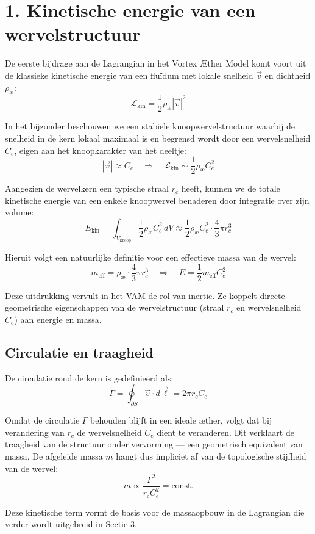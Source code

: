 \section*{1. Kinetische energie van een wervelstructuur}

De eerste bijdrage aan de Lagrangian in het Vortex Æther Model komt voort uit de klassieke kinetische energie van een fluïdum met lokale snelheid $\vec{v}$ en dichtheid $\rho_\text{\ae}$:
\[
    \mathcal{L}_\text{kin} = \frac{1}{2} \rho_\text{\ae} |\vec{v}|^2
\]

In het bijzonder beschouwen we een stabiele knoopwervelstructuur waarbij de snelheid in de kern lokaal maximaal is en begrensd wordt door een wervelsnelheid $C_e$, eigen aan het knoopkarakter van het deeltje:
\[
    |\vec{v}| \approx C_e \quad \Rightarrow \quad \mathcal{L}_\text{kin} \sim \frac{1}{2} \rho_\text{\ae} C_e^2
\]

Aangezien de wervelkern een typische straal $r_c$ heeft, kunnen we de totale kinetische energie van een enkele knoopwervel benaderen door integratie over zijn volume:
\[
    E_\text{kin} = \int_{V_\text{knoop}} \frac{1}{2} \rho_\text{\ae} C_e^2 \, dV \approx \frac{1}{2} \rho_\text{\ae} C_e^2 \cdot \frac{4}{3}\pi r_c^3
\]

Hieruit volgt een natuurlijke definitie voor een effectieve massa van de wervel:
\[
    m_\text{eff} = \rho_\text{\ae} \cdot \frac{4}{3}\pi r_c^3
    \quad \Rightarrow \quad E = \frac{1}{2} m_\text{eff} C_e^2
\]

Deze uitdrukking vervult in het VAM de rol van inertie. Ze koppelt directe geometrische eigenschappen van de wervelstructuur (straal $r_c$ en wervelsnelheid $C_e$) aan energie en massa.

\subsection*{Circulatie en traagheid}
De circulatie rond de kern is gedefinieerd als:
\[
    \Gamma = \oint_{\partial S} \vec{v} \cdot d\vec{\ell} = 2\pi r_c C_e
\]

Omdat de circulatie $\Gamma$ behouden blijft in een ideale æther, volgt dat bij verandering van $r_c$ de wervelsnelheid $C_e$ dient te veranderen. Dit verklaart de traagheid van de structuur onder vervorming — een geometrisch equivalent van massa. De afgeleide massa $m$ hangt dus impliciet af van de topologische stijfheid van de wervel:
\[
    m \propto \frac{\Gamma^2}{r_c C_e^2} = \text{const.}
\]

Deze kinetische term vormt de basis voor de massaopbouw in de Lagrangian die verder wordt uitgebreid in Sectie 3.